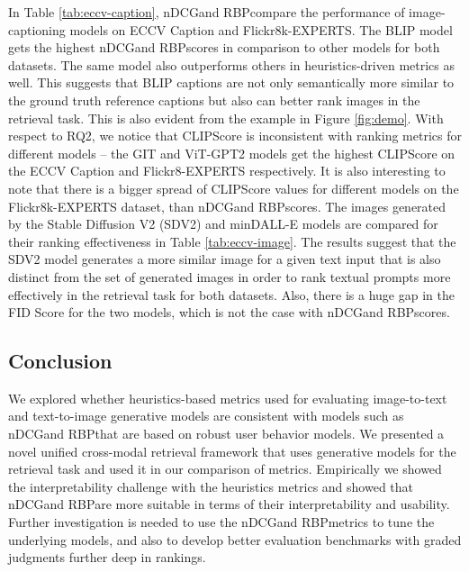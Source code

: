 \par In Table \ref{tab:eccv-caption}, nDCG\textquotesingle@K and RBP\textquotesingle@K compare the performance of image-captioning models on ECCV Caption and Flickr8k-EXPERTS. The BLIP model gets the highest nDCG\textquotesingle@K and RBP\textquotesingle@K scores in comparison to other models for both datasets. The same model also outperforms others in heuristics-driven metrics as well. This suggests that BLIP captions are not only semantically more similar to the ground truth reference captions but also can better rank images in the retrieval task. This is also evident from the example in Figure \ref{fig:demo}. With respect to RQ2, we notice that CLIPScore is inconsistent with ranking metrics for different models -- the GIT and ViT-GPT2 models get the highest CLIPScore on the ECCV Caption and Flickr8-EXPERTS respectively. It is also interesting to note that there is a bigger spread of CLIPScore values for different models on the Flickr8k-EXPERTS dataset, than nDCG\textquotesingle@K and RBP\textquotesingle@K scores. The images generated by the Stable Diffusion V2 (SDV2) and minDALL-E models are compared for their ranking effectiveness in Table \ref{tab:eccv-image}. The results suggest that the SDV2 model generates a more similar image for a given text input that is also distinct from the set of generated images in order to rank textual prompts more effectively in the retrieval task for both datasets. Also, there is a huge gap in the FID Score for the two models, which is not the case with nDCG\textquotesingle@K and RBP\textquotesingle@K scores.

\subsection{Conclusion}
We explored whether heuristics-based metrics used for evaluating image-to-text and text-to-image generative models are consistent with models such as nDCG\textquotesingle@K and RBP\textquotesingle@K that are based on robust user behavior models. We presented a novel unified cross-modal retrieval framework that uses generative models for the retrieval task and used it in our comparison of metrics. Empirically we showed the interpretability challenge with the heuristics metrics and showed that nDCG\textquotesingle@K and RBP\textquotesingle@K are more suitable in terms of their interpretability and usability. Further investigation is needed to use the nDCG\textquotesingle@K and RBP\textquotesingle@K metrics to tune the underlying models, and also to develop better evaluation benchmarks with graded judgments further deep in rankings. 